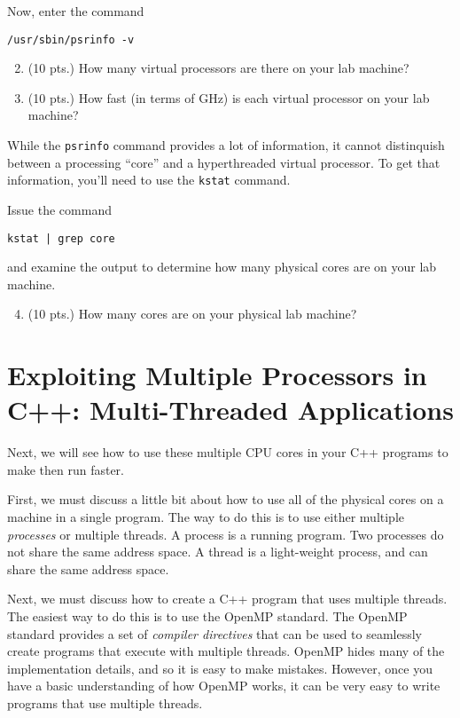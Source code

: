 \documentclass[12pt]{article}
\begin{document}
Now, enter the command
\begin{verbatim}
/usr/sbin/psrinfo -v
\end{verbatim}

\begin{enumerate}
\setcounter{enumi}{1}
\item (10 pts.) How many virtual processors are there on your lab machine?
\item (10 pts.) How fast (in terms of GHz) is each virtual processor on your lab machine?
\end{enumerate}

While the \verb+psrinfo+ command provides a lot of information, it cannot distinquish between a processing ``core'' and a hyperthreaded virtual processor.  To get that information, you'll need to use the \verb+kstat+ command.

Issue the command 
\begin{verbatim}
kstat | grep core
\end{verbatim}
and examine the output to determine how many physical cores are on your lab machine.

\begin{enumerate}
\setcounter{enumi}{3}
\item (10 pts.) How many cores are on your physical lab machine?
\end{enumerate}

\section*{Exploiting Multiple Processors in C++: Multi-Threaded Applications}{}
Next, we will see how to use these multiple CPU cores in your C++
programs to make then run faster.

First, we must discuss a little bit about how to use all of the
physical cores on a machine in a single program.  The way to do this
is to use either multiple \emph{processes} or multiple {threads}.
A process is a running program.  Two processes do not share the same
address space.  A thread is a light-weight process, and can share the same address space.  

Next, we must discuss how to create a C++ program that uses multiple
threads.   The easiest way to do this is to use the OpenMP standard.
The OpenMP standard provides a set of \emph{compiler directives} 
that can be used to seamlessly create programs that execute with multiple
threads.   OpenMP hides many of the implementation details, and so it is
easy to make mistakes.  However, once you have a basic understanding of how OpenMP works, it can be very easy to write programs that use multiple threads.
\end{document}
